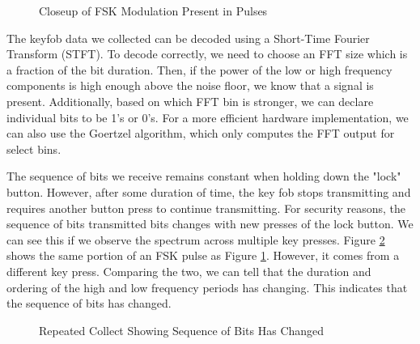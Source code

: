 \documentclass{article}
\begin{document}
\begin{figure}[H]
	\centerline{}
	\caption{Closeup of FSK Modulation Present in Pulses}
	\label{fig::car_key_spectrogram_focus}
\end{figure}

The keyfob data we collected can be decoded using a Short-Time Fourier Transform (STFT). To decode correctly, we need to choose an FFT size which is a fraction of the bit duration. Then, if the power of the low or high frequency components is high enough above the noise floor, we know that a signal is present. Additionally, based on which FFT bin is stronger, we can declare individual bits to be 1's or 0's. For a more efficient hardware implementation, we can also use the Goertzel algorithm, which only computes the FFT output for select bins. 

The sequence of bits we receive remains constant when holding down the "lock" button. However, after some duration of time, the key fob stops transmitting and requires another button press to continue transmitting. For security reasons, the sequence of bits transmitted bits changes with new presses of the lock button. We can see this if we observe the spectrum across multiple key presses. Figure \ref{fig::car_key_spectrogram_repeat} shows the same portion of an FSK pulse as Figure \ref{fig::car_key_spectrogram_focus}. However, it comes from a different key press. Comparing the two, we can tell that the duration and ordering of the high and low frequency periods has changing. This indicates that the sequence of bits has changed.

\begin{figure}[H]
	\centerline{}
	\caption{Repeated Collect Showing Sequence of Bits Has Changed}
	\label{fig::car_key_spectrogram_repeat}
\end{figure}
 
\end{document}
